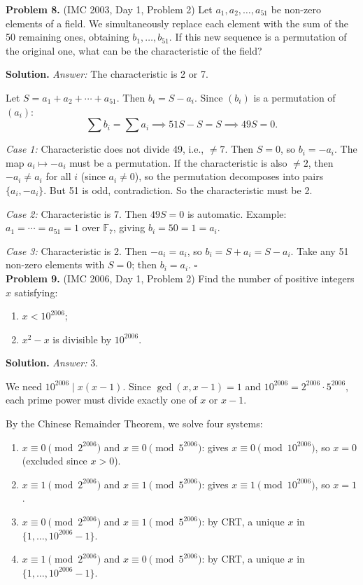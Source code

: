 \documentclass{article}
\begin{document}
\textbf{Problem 8.} (IMC 2003, Day 1, Problem 2)
Let \( a_1, a_2, \ldots, a_{51} \) be non-zero elements of a field. We simultaneously replace each element with the sum of the 50 remaining ones, obtaining \( b_1, \ldots, b_{51} \). If this new sequence is a permutation of the original one, what can be the characteristic of the field?

\textbf{Solution.}
\textit{Answer:} The characteristic is 2 or 7.

Let \( S = a_1 + a_2 + \cdots + a_{51} \). Then \( b_i = S - a_i \). Since \( (b_i) \) is a permutation of \( (a_i) \):
\[
\sum b_i = \sum a_i \implies 51S - S = S \implies 49S = 0.
\]

\textit{Case 1:} Characteristic does not divide 49, i.e., \( \neq 7 \). Then \( S = 0 \), so \( b_i = -a_i \). The map \( a_i \mapsto -a_i \) must be a permutation. If the characteristic is also \( \neq 2 \), then \( -a_i \neq a_i \) for all \( i \) (since \( a_i \neq 0 \)), so the permutation decomposes into pairs \( \{a_i, -a_i\} \). But 51 is odd, contradiction. So the characteristic must be 2.

\textit{Case 2:} Characteristic is 7. Then \( 49S = 0 \) is automatic. Example: \( a_1 = \cdots = a_{51} = 1 \) over \( \mathbb{F}_7 \), giving \( b_i = 50 = 1 = a_i \). \checkmark

\textit{Case 3:} Characteristic is 2. Then \( -a_i = a_i \), so \( b_i = S + a_i = S - a_i \). Take any 51 non-zero elements with \( S = 0 \); then \( b_i = a_i \). \checkmark \hfill\(\square\)
\\

\textbf{Problem 9.} (IMC 2006, Day 1, Problem 2)
Find the number of positive integers \( x \) satisfying:
\begin{enumerate}
    \item \( x < 10^{2006} \);
    \item \( x^2 - x \) is divisible by \( 10^{2006} \).
\end{enumerate}

\textbf{Solution.}
\textit{Answer:} 3.

We need \( 10^{2006} \mid x(x-1) \). Since \( \gcd(x, x-1) = 1 \) and \( 10^{2006} = 2^{2006} \cdot 5^{2006} \), each prime power must divide exactly one of \( x \) or \( x - 1 \).

By the Chinese Remainder Theorem, we solve four systems:
\begin{enumerate}
    \item \( x \equiv 0 \pmod{2^{2006}} \) and \( x \equiv 0 \pmod{5^{2006}} \): gives \( x \equiv 0 \pmod{10^{2006}} \), so \( x = 0 \) (excluded since \( x > 0 \)).
    \item \( x \equiv 1 \pmod{2^{2006}} \) and \( x \equiv 1 \pmod{5^{2006}} \): gives \( x \equiv 1 \pmod{10^{2006}} \), so \( x = 1 \).
    \item \( x \equiv 0 \pmod{2^{2006}} \) and \( x \equiv 1 \pmod{5^{2006}} \): by CRT, a unique \( x \) in \( \{1, \ldots, 10^{2006} - 1\} \).
    \item \( x \equiv 1 \pmod{2^{2006}} \) and \( x \equiv 0 \pmod{5^{2006}} \): by CRT, a unique \( x \) in \( \{1, \ldots, 10^{2006} - 1\} \).
\end{enumerate}
\end{document}
